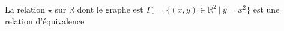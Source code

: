 La relation $\star$ sur $\mathbb R$ dont le graphe est $\Gamma_\star=\{(x,y)\in\mathbb R^2\:|\: y=x^2\}$ est une relation d'équivalence

\begin{reponses}
\end{reponses}

